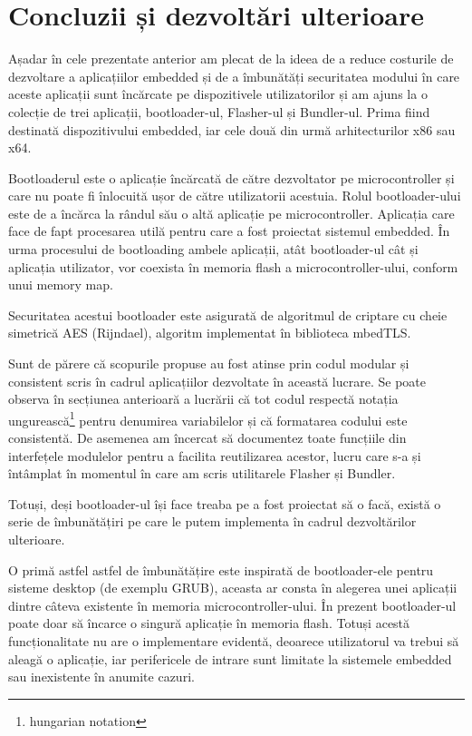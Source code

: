 \documentclass[12pt,a4paper,titlepage]{report}
\begin{document}
\section{Concluzii și dezvoltări ulterioare}

Așadar în cele prezentate anterior am plecat de la ideea de a reduce costurile de dezvoltare a aplicațiilor embedded și de a îmbunătăți securitatea modului în care aceste aplicații sunt încărcate pe dispozitivele utilizatorilor și am ajuns la o colecție de trei aplicații, bootloader-ul, Flasher-ul și Bundler-ul. Prima fiind destinată dispozitivului embedded, iar cele două din urmă arhitecturilor x86 sau x64.

Bootloaderul este o aplicație încărcată de către dezvoltator pe microcontroller și care nu poate fi înlocuită ușor de către utilizatorii acestuia.
Rolul bootloader-ului este de a încărca la rândul său o altă aplicație pe microcontroller. Aplicația care face de fapt procesarea utilă pentru care a fost proiectat sistemul embedded.
În urma procesului de bootloading ambele aplicații, atât bootloader-ul cât și aplicația utilizator, vor coexista în
memoria flash a microcontroller-ului, conform unui memory map.

Securitatea acestui bootloader este asigurată de algoritmul de criptare cu cheie simetrică AES (Rijndael), algoritm implementat în biblioteca mbedTLS.

Sunt de părere că scopurile propuse au fost atinse prin codul modular și consistent scris în cadrul aplicațiilor dezvoltate în această lucrare. Se poate observa în secțiunea anterioară a lucrării că tot codul respectă notația ungurească\footnote{hungarian notation} pentru denumirea variabilelor și că formatarea codului este consistentă. De asemenea am încercat să documentez toate funcțiile din interfețele modulelor pentru a facilita reutilizarea acestor, lucru care s-a și întâmplat în momentul în care am scris utilitarele Flasher și Bundler.

Totuși, deși bootloader-ul își face treaba pe a fost proiectat să o facă, există o serie de îmbunătățiri pe care le putem implementa în cadrul dezvoltărilor ulterioare.

O primă astfel astfel de îmbunătățire este inspirată de bootloader-ele pentru sisteme desktop (de exemplu GRUB), aceasta ar consta în alegerea unei aplicații dintre câteva existente în memoria microcontroller-ului. În prezent bootloader-ul poate doar să încarce o singură aplicație în memoria flash. Totuși acestă funcționalitate nu are o implementare evidentă, deoarece utilizatorul va trebui să aleagă o aplicație, iar perifericele de intrare sunt limitate la sistemele embedded sau inexistente în anumite cazuri.
\end{document}
